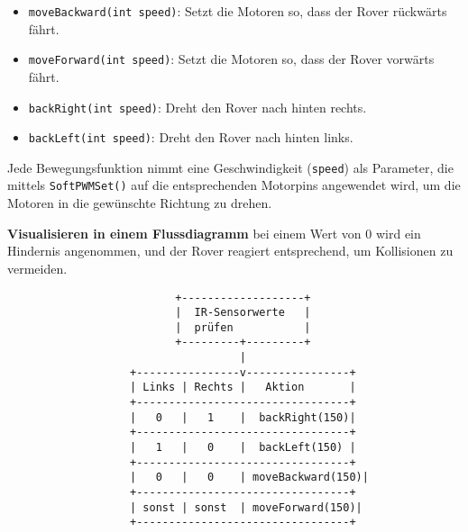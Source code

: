 \documentclass{vorlage-design-main}
\begin{document}
\begin{enumerate}
  \begin{itemize}
  
  \item
    \verb|moveBackward(int speed)|: Setzt die Motoren
    so, dass der Rover rückwärts fährt.
  \item
    \verb|moveForward(int speed)|: Setzt die Motoren
    so, dass der Rover vorwärts fährt.
  \item
    \verb|backRight(int speed)|: Dreht den Rover nach
    hinten rechts.
  \item
    \verb|backLeft(int speed)|: Dreht den Rover nach
    hinten links.
  \end{itemize}
\end{enumerate}

Jede Bewegungsfunktion nimmt eine Geschwindigkeit
(\verb|speed|) als Parameter, die mittels
\verb|SoftPWMSet()| auf die entsprechenden Motorpins
angewendet wird, um die Motoren in die gewünschte Richtung zu drehen.

\newpage

\textbf{Visualisieren in einem Flussdiagramm} bei einem Wert von 0 wird
ein Hindernis angenommen, und der Rover reagiert entsprechend, um
Kollisionen zu vermeiden.

\begin{lstlisting}
                          +-------------------+
                          |  IR-Sensorwerte   |
                          |  prüfen           |
                          +---------+---------+
                                    |
                   +----------------v----------------+
                   | Links | Rechts |   Aktion       |
                   +---------------------------------+
                   |   0   |   1    |  backRight(150)|
                   +---------------------------------+
                   |   1   |   0    |  backLeft(150) |
                   +---------------------------------+
                   |   0   |   0    | moveBackward(150)|
                   +---------------------------------+
                   | sonst | sonst  | moveForward(150)|
                   +---------------------------------+
\end{lstlisting}

\newpage
\end{document}
